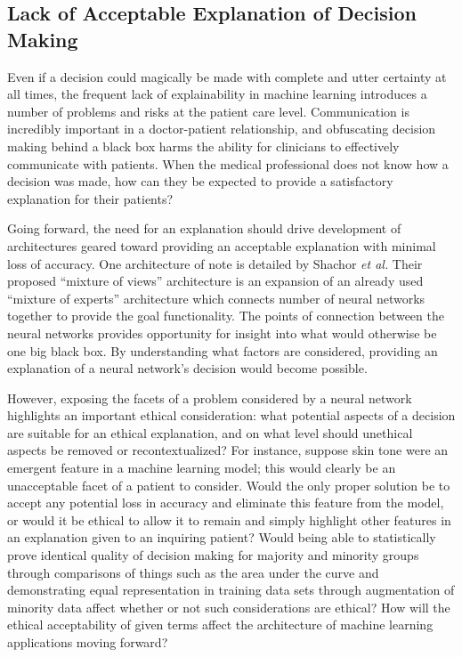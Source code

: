 \documentclass[]{article}
\begin{document}
		\subsection{Lack of Acceptable Explanation of Decision Making}\label{explanation}
			Even if a decision could magically be made with complete and utter certainty at all times, the frequent lack of explainability in machine learning introduces a number of problems and risks at the patient care level. Communication is incredibly important in a doctor-patient relationship,\cite{ha2010doctor} and obfuscating decision making behind a black box harms the ability for clinicians to effectively communicate with patients. When the medical professional does not know how a decision was made, how can they be expected to provide a satisfactory explanation for their patients?

			Going forward, the need for an explanation should drive development of architectures geared toward providing an acceptable explanation with minimal loss of accuracy. One architecture of note is detailed by Shachor \emph{et al.} Their proposed ``mixture of views'' architecture is an expansion of an already used ``mixture of experts'' architecture which connects number of neural networks together to provide the goal functionality.\cite{shachor2020mixture} The points of connection between the neural networks provides opportunity for insight into what would otherwise be one big black box. By understanding what factors are considered, providing an explanation of a neural network's decision would become possible.

			However, exposing the facets of a problem considered by a neural network highlights an important ethical consideration: what potential aspects of a decision are suitable for an ethical explanation, and on what level should unethical aspects be removed or recontextualized? For instance, suppose skin tone were an emergent feature in a machine learning model; this would clearly be an unacceptable facet of a patient to consider. Would the only proper solution be to accept any potential loss in accuracy and eliminate this feature from the model, or would it be ethical to allow it to remain and simply highlight other features in an explanation given to an inquiring patient? Would being able to statistically prove identical quality of decision making for majority and minority groups through comparisons of things such as the area under the curve and demonstrating equal representation in training data sets through augmentation of minority data\cite{shin2018medical} affect whether or not such considerations are ethical? How will the ethical acceptability of given terms affect the architecture of machine learning applications moving forward?
\end{document}
